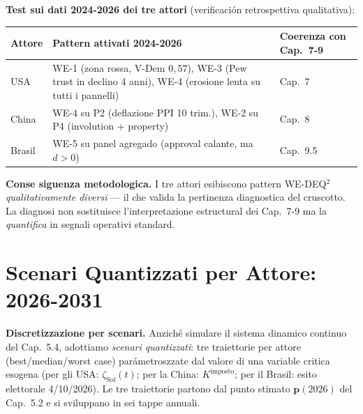 \Proved{} \textbf{Test sui dati 2024-2026 dei tre attori} (verificación
retrospettiva qualitativa):

{\def\LTcaptype{none} %
{\small\begin{longtable}[]{@{}
  >{\raggedright\arraybackslash}p{}
  >{\raggedright\arraybackslash}p{}
  >{\raggedright\arraybackslash}p{}@{}}
\toprule\noalign{}
\begin{minipage}[b]{\linewidth}\raggedright
Attore
\end{minipage} & \begin{minipage}[b]{\linewidth}\raggedright
Pattern attivati 2024-2026
\end{minipage} & \begin{minipage}[b]{\linewidth}\raggedright
Coerenza con Cap.~7-9
\end{minipage} \\
\midrule\noalign{}
\endhead
\bottomrule\noalign{}
\endlastfoot
USA & WE-1 (zona rossa, V-Dem \(0{,}57\)), WE-3 (Pew trust in declino 4
anni), WE-4 (erosione lenta su tutti i pannelli) & \Proved{} Cap.~7 \\
China & WE-4 su P2 (deflazione PPI 10 trim.), WE-2 su P4 (involution +
property) & \Proved{} Cap.~8 \\
Brasil & WE-5 su panel agregado (approval calante, ma \(d > 0\)) &
\Proved{} Cap.~9.5 \\
\end{longtable}}
}

\Hypoth{} \textbf{Conse siguenza metodologica.} I tre attori esibiscono
pattern WE-DEQ$^2$ \emph{qualitativamente diversi} --- il che valida la
pertinenza diagnostica del cruscotto. La diagnosi non sostituisce
l'interpretazione estructural dei Cap.~7-9 ma la \emph{quantifica} in
segnali operativi standard.



\section{Scenari Quantizzati per Attore:
2026-2031}\label{scenari-quantizzati-per-attore-2026-2031}

\Hypoth{} \textbf{Discretizzazione per scenari.} Anziché simulare il
sistema dinamico continuo del Cap.~5.4, adottiamo \emph{scenari
quantizzati}: tre traiettorie per attore (best/median/worst case)
parámetroszzate dal valore di una variable critica esogena (per gli USA:
\(\zeta_{\text{Sol}}(t)\); per la China: \(K^{\text{imposto}}\); per il
Brasil: esito elettorale 4/10/2026). Le tre traiettorie partono dal
punto stimato \(\boldsymbol{p}(2026)\) del Cap.~5.2 e si sviluppano in
sei tappe annuali.

